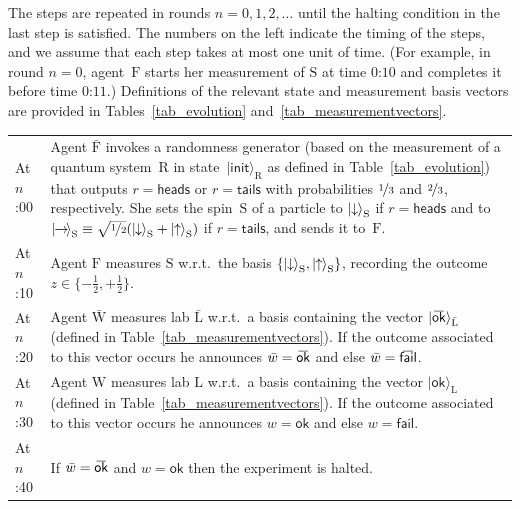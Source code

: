 \documentclass{article}
\theoremstyle{mystyle}
\theoremstyle{definition}
\newcommand{\oline}[2]{{\mkern#2mu\overline{\protect\vphantom{t}\mkern-#2mu\smash{#1}\mkern-#2mu}\mkern#2mu}}
\newcommand*{\ket}[1]{{| #1 \rangle}}
\newcommand*{\Friendone}{\mathrm{\bar{F}}}
\newcommand*{\Friendtwo}{\mathrm{F}}
\newcommand*{\Labone}{\mathrm{\bar{L}}}
\newcommand*{\Labtwo}{\mathrm{L}}
\newcommand*{\Assistant}{\mathrm{\bar{W}}}
\newcommand*{\Wigner}{\mathrm{W}}
\newcommand*{\Spin}{\mathrm{S}}
\newcommand*{\Coin}{\mathrm{R}}
\newcommand*{\wb}{\bar{w}}
\newcommand*{\spinup}{\ket{{\hspace{-0.1ex}\uparrow\hspace{-0.1ex}}}}
\newcommand*{\spindown}{\ket{{\hspace{-0.1ex}\downarrow\hspace{-0.1ex}}}}
\newcommand*{\spinright}{\ket{{\hspace{-0.2ex}\rightarrow\hspace{-0.4ex}}}}
\newcommand*{\sminus}{{\textstyle - \frac{1}{2}}}
\newcommand*{\splus}{{\textstyle + \frac{1}{2}}}
\newcommand*{\ok}{\mathsf{ok}}
\newcommand*{\fail}{\mathsf{fail}}
\newcommand*{\okb}{\oline{\ok}{2.8}}
\newcommand*{\failb}{\oline{\fail}{5}}
\newcommand*{\head}{\mathsf{heads}}
\newcommand*{\tail}{\mathsf{tails}}
\begin{document}
{
\newcommand*{\lb}{\\[1.4ex]}

\begin{framed}

\vspace{-0.5ex}


\vspace{1.1ex}

{\footnotesize

\noindent The steps are repeated in rounds $n = 0, 1, 2, \ldots $  until the halting condition in the last step is satisfied.  The numbers on the left indicate the timing of the steps, and we assume that each step takes at most one unit of time.  (For example, in round $n=0$, agent~$\Friendtwo$ starts her measurement of $\Spin$ at time $\text{0:10}$ and completes it before time $\text{0:11}$.) Definitions of the relevant state and measurement basis vectors are provided in Tables~\ref{tab_evolution} and~\ref{tab_measurementvectors}. 

\vspace{-0.6ex}

\begin{center}

\begin{tabular}{p{3.7em} p{}}
At $n$:00 & Agent $\Friendone$ invokes a randomness generator (based on the measurement of a quantum system~$\Coin$ in state~$\ket{\mathsf{init}}_{\Coin}$ as defined in Table~\ref{tab_evolution}) that outputs $r=\head$ or $r=\tail$ with probabilities $\nicefrac{1}{3}$ and $\nicefrac{2}{3}$, respectively.  She sets the spin~$\Spin$ of a particle to  $\spindown_{\Spin}$ if $r =\head$ and to $\spinright_\Spin \equiv \smash{\sqrt{\nicefrac{1}{2}}(\spindown_{\Spin} + \spinup_{\Spin})}$ if $r = \tail$, and  sends it to~$\Friendtwo$. 
\lb
At $n$:10 & Agent $\Friendtwo$ measures $\Spin$ w.r.t.\ the basis $\{\spindown_\Spin, \spinup_\Spin\}$, recording the outcome $z \in \{\sminus, \splus\}$.  
\lb
At $n$:20 &  Agent $\Assistant$ measures lab $\Labone$ w.r.t.\ a basis containing the vector  $\ket{\okb}_{\Labone}$ (defined in Table~\ref{tab_measurementvectors}). If the outcome associated to this vector occurs he announces $\wb=\okb$ and else $\wb=\failb$. 
\lb
 At $n$:30 &  Agent $\Wigner$ measures lab $\Labtwo$ w.r.t.\ a basis containing the vector $\ket{\ok}_{\Labtwo}$ (defined in Table~\ref{tab_measurementvectors}). If the outcome associated to this vector occurs he announces $w=\ok$  and else $w=\fail$. 
 \lb
At $n$:40 & If $\wb = \okb$ and $w = \ok$ then the experiment is halted. \\[-1ex]
\end{tabular}
\end{center}
}

\vspace{-2ex}

\end{framed}
}
\end{document}
